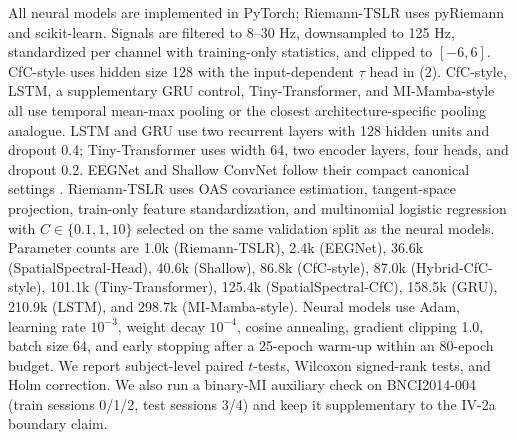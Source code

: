 \documentclass[journal]{IEEEtran}
\begin{document}
All neural models are implemented in PyTorch; Riemann-TSLR uses pyRiemann and scikit-learn. Signals are filtered to 8--30 Hz, downsampled to 125 Hz, standardized per channel with training-only statistics, and clipped to $[-6,6]$. CfC-style uses hidden size 128 with the input-dependent $\tau$ head in (2). CfC-style, LSTM, a supplementary GRU control, Tiny-Transformer, and MI-Mamba-style all use temporal mean-max pooling or the closest architecture-specific pooling analogue. LSTM and GRU use two recurrent layers with 128 hidden units and dropout 0.4; Tiny-Transformer uses width 64, two encoder layers, four heads, and dropout 0.2. EEGNet and Shallow ConvNet follow their compact canonical settings \cite{lawhern2018eegnet,schirrmeister2017deep}. Riemann-TSLR uses OAS covariance estimation, tangent-space projection, train-only feature standardization, and multinomial logistic regression with $C \in \{0.1,1,10\}$ selected on the same validation split as the neural models. Parameter counts are 1.0k (Riemann-TSLR), 2.4k (EEGNet), 36.6k (SpatialSpectral-Head), 40.6k (Shallow), 86.8k (CfC-style), 87.0k (Hybrid-CfC-style), 101.1k (Tiny-Transformer), 125.4k (SpatialSpectral-CfC), 158.5k (GRU), 210.9k (LSTM), and 298.7k (MI-Mamba-style). Neural models use Adam, learning rate $10^{-3}$, weight decay $10^{-4}$, cosine annealing, gradient clipping 1.0, batch size 64, and early stopping after a 25-epoch warm-up within an 80-epoch budget. We report subject-level paired $t$-tests, Wilcoxon signed-rank tests, and Holm correction. We also run a binary-MI auxiliary check on BNCI2014-004 (train sessions 0/1/2, test sessions 3/4) and keep it supplementary to the IV-2a boundary claim.
\end{document}
